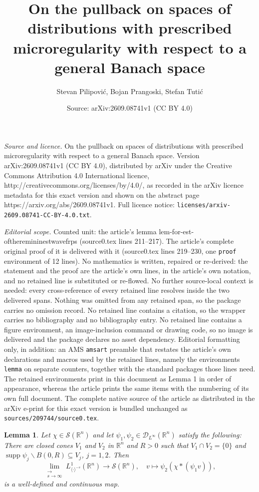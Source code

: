 \documentclass[10pt,a4paper]{amsart}
\title{On the pullback on spaces of distributions with prescribed microregularity with respect to a general Banach space}
\author{Stevan Pilipovi\'c, Bojan Prangoski, Stefan Tuti\'c}
\date{Source: arXiv:2609.08741v1 (CC BY 4.0)}
\newtheorem{lemma}{Lemma}
\newcommand{\DD}{\mathcal D}
\newcommand{\RR}{\mathbb R}
\newcommand{\SSS}{\mathcal S}
\newcommand{\supp}{\operatorname{supp}}
\begin{document}
\maketitle

\noindent\emph{Source and licence.} On the pullback on spaces of distributions with prescribed microregularity with respect to a general Banach space. Version arXiv:2609.08741v1 (CC BY 4.0), distributed by arXiv under the Creative Commons Attribution 4.0 International licence, http://creativecommons.org/licenses/by/4.0/, as recorded in the arXiv licence metadata for this exact version and shown on the abstract page https://arxiv.org/abs/2609.08741v1. Full licence notice: \texttt{licenses/arxiv-2609.08741-CC-BY-4.0.txt}.\par\smallskip

\noindent\textit{Editorial scope.} Counted unit: the article's lemma lem-for-est-oftheremininestwavefrps (source0.tex lines 211--217). The article's complete original proof of it is delivered with it (source0.tex lines 219--230, one \texttt{proof} environment of 12 lines). No mathematics is written, repaired or re-derived: the statement and the proof are the article's own lines, in the article's own notation, and no retained line is substituted or re-flowed.  No further source-local context is needed: every cross-reference of every retained line resolves inside the two delivered spans.  Nothing was omitted from any retained span, so the package carries no omission record.  No retained line contains a citation, so the wrapper carries no bibliography and no bibliography entry.  No retained line contains a figure environment, an image-inclusion command or drawing code, so no image is delivered and the package declares no asset dependency.  Editorial formatting only, in addition: an AMS \texttt{amsart} preamble that restates the article's own declarations and macros used by the retained lines, namely the environments \texttt{lemma} on separate counters, together with the standard packages those lines need.  The retained environments print in this document as Lemma 1 in order of appearance, whereas the article prints the same items with the numbering of its own full document.  The complete native source of the article as distributed in the arXiv e-print for this exact version is bundled unchanged as \texttt{sources/209744/source0.tex}.
\begin{lemma}\label{lem-for-est-oftheremininestwavefrps}
Let $\chi\in\SSS(\RR^n)$ and let $\psi_1,\psi_2\in\DD_{L^{\infty}}(\RR^n)$ satisfy the following: There are closed cones $V_1$ and $V_2$ in $\RR^n$ and $R>0$ such that $V_1\cap V_2=\{0\}$ and $\supp\psi_j\backslash B(0,R)\subseteq V_j$, $j=1,2$. Then
\begin{equation}\label{map-con-onskl}
\lim_{\substack{\longrightarrow \\ s\rightarrow\infty}}L^1_{\langle \cdot\rangle^{-s}}(\RR^n)\rightarrow \SSS(\RR^n),\quad v\mapsto \psi_2(\chi*(\psi_1v)),
\end{equation}
is a well-defined and continuous map.
\end{lemma}
\end{document}
